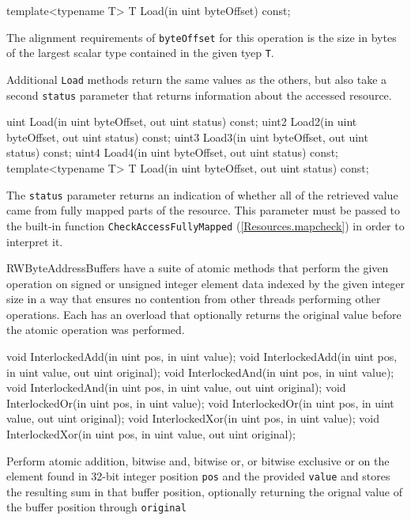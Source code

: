 \begin{HLSL}
  template<typename T>
  T Load(in uint byteOffset) const;
\end{HLSL}

The alignment requirements of \texttt{byteOffset} for this operation is the size in bytes of the largest
scalar type contained in the given tyep \texttt{T}.

Additional \texttt{Load} methods return the same values as the others,
but also take a second \texttt{status} parameter that returns information about the accessed resource.
\begin{HLSL}
  uint Load(in uint byteOffset, out uint status) const;
  uint2 Load2(in uint byteOffset, out uint status) const;
  uint3 Load3(in uint byteOffset, out uint status) const;
  uint4 Load4(in uint byteOffset, out uint status) const;
  template<typename T>
  T Load(in uint byteOffset, out uint status) const;
\end{HLSL}

The \texttt{status} parameter returns an indication of whether all of the retrieved value
came from fully mapped parts of the resource.
This parameter must be passed to the built-in function \texttt{CheckAccessFullyMapped} (\ref{Resources.mapcheck})
in order to interpret it.


RWByteAddressBuffers have a suite of atomic methods that perform the given operation
on signed or unsigned integer element data indexed by the given integer size
in a way that ensures no contention from other threads performing other operations.
Each has an overload that optionally returns the original value before the atomic operation was performed.

\begin{HLSL}
   void InterlockedAdd(in uint pos, in uint value);
   void InterlockedAdd(in uint pos, in uint value, out uint original);
   void InterlockedAnd(in uint pos, in uint value);
   void InterlockedAnd(in uint pos, in uint value, out uint original);
   void InterlockedOr(in uint pos, in uint value);
   void InterlockedOr(in uint pos, in uint value, out uint original);
   void InterlockedXor(in uint pos, in uint value);
   void InterlockedXor(in uint pos, in uint value, out uint original);
\end{HLSL}

Perform atomic addition, bitwise and, bitwise or, or bitwise exclusive or
on the element found in 32-bit integer position \texttt{pos} and the provided \texttt{value}
and stores the resulting sum in that buffer position,
optionally returning the orignal value of the buffer position through \texttt{original}

